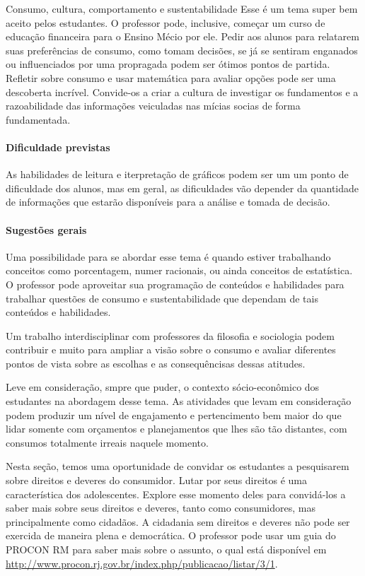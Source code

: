 \begin{paginatexto}{Consumo, cultura, comportamento e sustentabilidade}
Esse é um tema super bem aceito pelos estudantes. O professor pode, inclusive, começar um curso de educação financeira para o Ensino Mécio por ele. Pedir aos alunos para relatarem suas preferências de consumo, como tomam decisões, se já se sentiram enganados ou influenciados por uma propragada podem ser ótimos pontos de partida. Refletir sobre consumo e usar matemática para avaliar opções pode ser uma descoberta incrível. Convide-os a criar a cultura de investigar os fundamentos e a razoabilidade das informações veiculadas nas mícias socias de forma fundamentada.

\paragraph{Dificuldade previstas}
As habilidades de leitura e iterpretação de gráficos podem ser um um ponto de dificuldade dos alunos, mas em geral, as dificuldades vão depender da quantidade de informações que estarão disponíveis para a análise e tomada de decisão.

\paragraph{Sugestões gerais}
Uma possibilidade para se abordar esse tema é quando estiver trabalhando conceitos como porcentagem, numer racionais, ou ainda conceitos de estatística. O professor pode aproveitar sua programação de conteúdos e habilidades para trabalhar questões de consumo e sustentabilidade que dependam de tais conteúdos e habilidades.

Um trabalho interdisciplinar com professores da filosofia e sociologia podem contribuir e muito para ampliar a visão sobre o consumo e avaliar diferentes pontos de vista sobre as escolhas e as consequêncisas dessas atitudes.

Leve em consideração, smpre que puder, o contexto sócio-econômico dos estudantes na abordagem desse tema. As atividades que levam em consideração podem produzir um nível de engajamento e pertencimento bem maior do que lidar somente com orçamentos e planejamentos que lhes são tão distantes, com consumos totalmente irreais naquele momento.

Nesta seção, temos uma oportunidade de convidar os estudantes a pesquisarem sobre direitos e deveres do consumidor. Lutar por seus direitos é uma característica dos adolescentes. Explore esse momento deles para convidá-los a saber mais sobre seus direitos e deveres, tanto como consumidores, mas principalmente como cidadãos. A cidadania sem direitos e deveres não pode ser exercida de maneira plena e democrática. O professor pode usar um guia do PROCON RM para saber mais sobre o assunto, o qual está disponível em \url{http://www.procon.rj.gov.br/index.php/publicacao/listar/3/1}.


\end{paginatexto}
